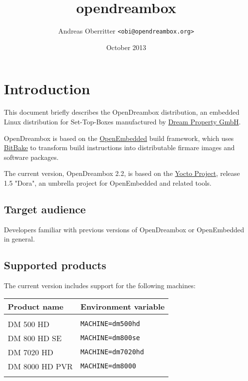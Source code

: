 \documentclass[a4paper]{article}
\newcommand{\shell}[1]{\texttt{\small #1}}
\begin{document}
\title{opendreambox}
\author{Andreas Oberritter \shell{<obi@opendreambox.org>}}
\date{October 2013}
\maketitle
\tableofcontents
\pagebreak

\section{Introduction}
  \begin{flushleft}
    This document briefly describes the OpenDreambox distribution, an embedded Linux
    distribution for Set-Top-Boxes manufactured by \href{http://www.dream-multimedia-tv.de/}{Dream Property GmbH}.

    OpenDreambox is based on the \href{http://www.openembedded.org/}{OpenEmbedded} build framework, which
    uses \href{http://bitbake.berlios.de/}{BitBake} to transform build instructions into
    distributable firmare images and software packages.

    The current version, OpenDreambox 2.2, is based on the \href{http://www.yoctoproject.org}{Yocto Project}, release 
    1.5 "Dora", an umbrella project for OpenEmbedded and related tools.
  \end{flushleft}

  \subsection{Target audience}
    \begin{flushleft}
      Developers familiar with previous versions of OpenDreambox or OpenEmbedded
      in general.
    \end{flushleft}

  \subsection{Supported products}
    \label{products}
    \begin{flushleft}
      The current version includes support for the following machines:

        \begin{tabular}{ | l | l | }
          \hline
          \textbf{Product name} & \textbf{Environment variable} \\ \hline
          & \\
          DM 500 HD & \shell{MACHINE=dm500hd} \\
          DM 800 HD SE & \shell{MACHINE=dm800se} \\
          DM 7020 HD & \shell{MACHINE=dm7020hd} \\
          DM 8000 HD PVR & \shell{MACHINE=dm8000} \\
          & \\
          \hline
        \end{tabular}
    \end{flushleft}
\end{document}
